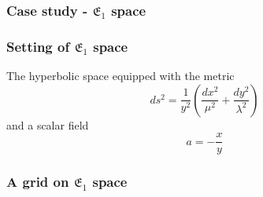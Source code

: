 \documentclass[aspectratio=169]{beamer}
\begin{document}
\begin{frame}
    \frametitle{Case study - $\mathfrak{E}_1$ space}
    \begin{figure}[ht]\centering
    \end{figure}
\end{frame}


\begin{frame}
    \frametitle{Setting of $\mathfrak{E}_1$ space}
    The hyperbolic space equipped with the metric
    \[
        ds^2 = \frac{1}{y^2}(\frac{dx^2}{\mu^2} + \frac{dy^2}{\lambda^2})
    \]
    and a scalar field
    \[
        a = - \frac{x}{y}
    \]
\end{frame}

\begin{frame}
    \frametitle{A grid on $\mathfrak{E}_1$ space}
    \begin{figure}[ht]\centering
    \end{figure}
\end{frame}
\end{document}
